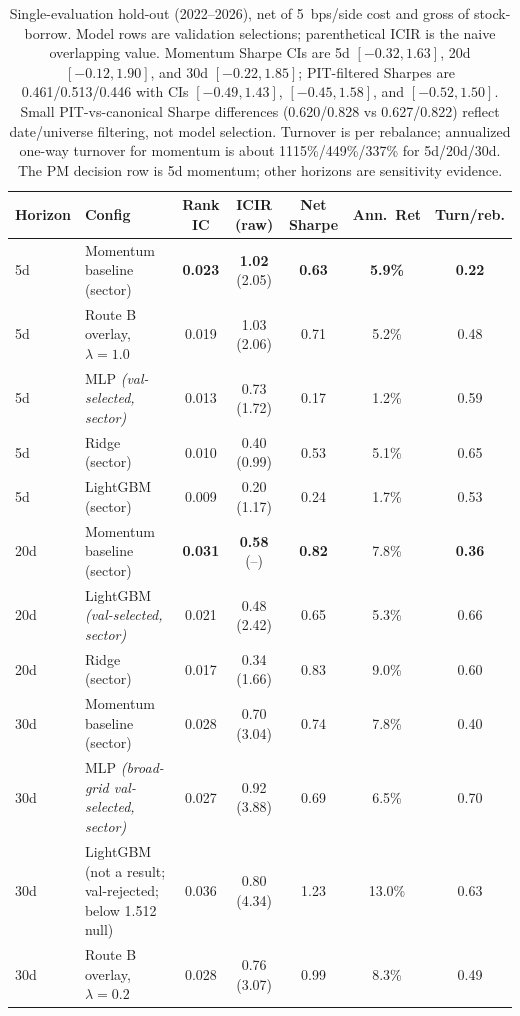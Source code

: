 \documentclass[9pt]{extarticle}
\begin{document}
\begin{table}[t]
  \centering
  \caption{Single-evaluation hold-out (2022--2026), net of 5~bps/side cost and gross of
  stock-borrow. Model rows are validation selections; parenthetical ICIR is the
  naive overlapping value. Momentum Sharpe CIs are 5d $[-0.32,1.63]$, 20d
  $[-0.12,1.90]$, and 30d $[-0.22,1.85]$; PIT-filtered Sharpes are
  0.461/0.513/0.446 with CIs $[-0.49,1.43]$, $[-0.45,1.58]$, and
  $[-0.52,1.50]$. Small PIT-vs-canonical Sharpe differences
  (0.620/0.828 vs 0.627/0.822) reflect date/universe filtering, not model
  selection. Turnover is per rebalance; annualized one-way turnover for momentum
  is about 1115\%/449\%/337\% for 5d/20d/30d. The PM decision row is 5d
  momentum; other horizons are sensitivity evidence.}\label{tab:results}
  \small
  \setlength{\tabcolsep}{4pt}
  \begin{tabular}{llccccc}
    \toprule
    Horizon & Config & Rank IC & ICIR (raw) & Net Sharpe & Ann.\ Ret & Turn/reb. \\
    \midrule
    5d  & Momentum baseline (sector)            & \textbf{0.023} & \textbf{1.02} (2.05) & \textbf{0.63} & \textbf{5.9\%} & \textbf{0.22} \\
    5d  & Route B overlay, $\lambda=1.0$         & 0.019 & 1.03 (2.06) & 0.71 & 5.2\% & 0.48 \\
    5d  & MLP \emph{(val-selected, sector)}      & 0.013 & 0.73 (1.72) & 0.17 & 1.2\% & 0.59 \\
    5d  & Ridge (sector)                        & 0.010 & 0.40 (0.99) & 0.53 & 5.1\% & 0.65 \\
    5d  & LightGBM (sector)                     & 0.009 & 0.20 (1.17) & 0.24 & 1.7\% & 0.53 \\
    \midrule
    20d & Momentum baseline (sector)            & \textbf{0.031} & \textbf{0.58} (--) & \textbf{0.82} & 7.8\% & \textbf{0.36} \\
    20d & LightGBM \emph{(val-selected, sector)} & 0.021 & 0.48 (2.42) & 0.65 & 5.3\% & 0.66 \\
    20d & Ridge (sector)                        & 0.017 & 0.34 (1.66) & 0.83 & 9.0\% & 0.60 \\
    \midrule
    30d & Momentum baseline (sector)            & 0.028 & 0.70 (3.04) & 0.74 & 7.8\% & 0.40 \\
    30d & MLP \emph{(broad-grid val-selected, sector)}      & 0.027 & 0.92 (3.88) & 0.69 & 6.5\% & 0.70 \\
    30d & LightGBM (not a result; val-rejected; below 1.512 null)  & 0.036 & 0.80 (4.34) & 1.23 & 13.0\% & 0.63 \\
    30d & Route B overlay, $\lambda=0.2$         & 0.028 & 0.76 (3.07) & 0.99 & 8.3\% & 0.49 \\
    \bottomrule
  \end{tabular}
\end{table}
\end{document}
